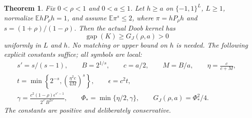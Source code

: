 \documentclass[11pt]{article}
\newcommand{\E}{\mathbb E}
\newtheorem{theorem}{Theorem}[section]
\begin{document}
\begin{theorem}\label{backgroundfullgap}
Fix $0<\rho<1$ and $0<a\leq1$. Let $h\geq a$ on $\{-1,1\}^L$, $L\geq1$,
normalize $\E hP_\rho h=1$, and assume $\E\pi^s\leq2$, where
$\pi=hP_\rho h$ and $s=(1+\rho)/(1-\rho)$. Then the actual Doob kernel has
\[
 \operatorname{gap}(K)\geq G_J(\rho,a)>0
\]
uniformly in $L$ and $h$. No matching or upper bound on $h$ is needed.
The following explicit constants suffice; all symbols are local:
\begin{gather*}
 s'=s/(s-1),\qquad B=2^{1/s},\qquad c=a/2,\qquad M=B/a,
 \qquad\eta=\frac{c}{c+M},\\
 t=\min\left\{2^{-s},\left(\frac{\eta^2c}{4M}\right)^s\right\},
 \qquad\epsilon=c^2t,\\
 \gamma=\frac{c^2(1-\rho)\epsilon^{s'-1}}{2^{s'}B^{2s'}},
 \qquad\Phi_* =\min\{\eta/2,\gamma\},
 \qquad G_J(\rho,a)=\Phi_*^2/4.
\end{gather*}
The constants are positive and deliberately conservative.
\end{theorem}
\end{document}
